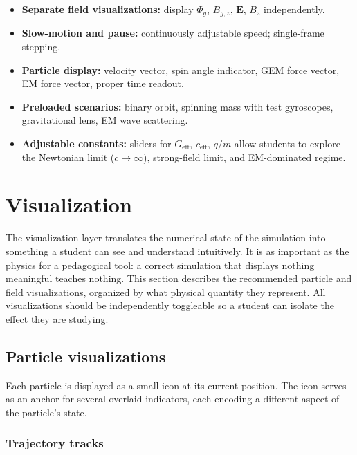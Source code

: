 \documentclass[11pt,a4paper]{article}
\newcommand{\vv}[1]{\mathbf{#1}}
\newcommand{\Phig}{\Phi_g}
\begin{document}
\begin{itemize}
  \item \textbf{Separate field visualizations:} display $\Phig$, $B_{g,z}$, $\vv{E}$, $B_z$ independently.
  \item \textbf{Slow-motion and pause:} continuously adjustable speed; single-frame stepping.
  \item \textbf{Particle display:} velocity vector, spin angle indicator, GEM force vector, EM force vector, proper time readout.
  \item \textbf{Preloaded scenarios:} binary orbit, spinning mass with test gyroscopes, gravitational lens, EM wave scattering.
  \item \textbf{Adjustable constants:} sliders for $G_{\mathrm{eff}}$, $c_{\mathrm{eff}}$, $q/m$ allow students to explore the Newtonian limit ($c\to\infty$), strong-field limit, and EM-dominated regime.
\end{itemize}

\section{Visualization}

The visualization layer translates the numerical state of the simulation into something a student can see and understand intuitively.  It is as important as the physics for a pedagogical tool: a correct simulation that displays nothing meaningful teaches nothing.  This section describes the recommended particle and field visualizations, organized by what physical quantity they represent.  All visualizations should be independently toggleable so a student can isolate the effect they are studying.

\subsection{Particle visualizations}

Each particle is displayed as a small icon at its current position.  The icon serves as an anchor for several overlaid indicators, each encoding a different aspect of the particle's state.

\subsubsection*{Trajectory tracks}
\end{document}
